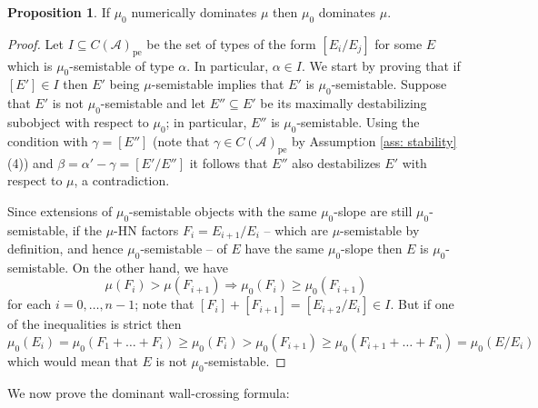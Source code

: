 \documentclass[12pt]{amsart}
\theoremstyle{definition}
\newtheorem{proposition}[definition]{Proposition}
\newcommand{\CA}{{\mathcal A}}
\newcommand{\1}{\mathbf 1}
\newcommand{\pe}{\mathrm{pe}}
\begin{document}
\begin{proposition}
    If $\mu_0$ numerically dominates $\mu$ then $\mu_0$ dominates $\mu$. 
\end{proposition}
\begin{proof}
Let $I\subseteq C(\CA)_\pe$ be the set of types of the form $[E_i/E_j]$ for some $E$ which is $\mu_0$-semistable of type $\alpha$. In particular, $\alpha\in I$. We start by proving that if $[E']\in I$ then $E'$ being $\mu$-semistable implies that $E'$ is $\mu_0$-semistable. Suppose that $E'$ is not $\mu_0$-semistable and let $E''\subseteq E'$ be its maximally destabilizing subobject with respect to $\mu_0$; in particular, $E''$ is $\mu_0$-semistable. Using the condition with $\gamma=[E'']$ (note that $\gamma\in C(\CA)_\pe$ by Assumption \ref{ass: stability}(4)) and $\beta=\alpha'-\gamma=[E'/E'']$ it follows that $E''$ also destabilizes $E'$ with respect to $\mu$, a contradiction.

Since extensions of $\mu_0$-semistable objects with the same $\mu_0$-slope are still $\mu_0$-semistable, if the $\mu$-HN factors $F_i=E_{i+1}/E_i$ -- which are $\mu$-semistable by definition, and hence $\mu_0$-semistable -- of $E$ have the same $\mu_0$-slope then $E$ is $\mu_0$-semistable. On the other hand, we have
\[\mu(F_i)>\mu(F_{i+1})\Rightarrow \mu_0(F_i)\geq \mu_0(F_{i+1})\]
for each $i=0, \ldots, n-1$; note that $[F_i]+[F_{i+1}]=[E_{i+2}/E_i]\in I$. But if one of the inequalities is strict then 
\[\mu_0(E_i)=\mu_0(F_1+\ldots+F_i)\geq \mu_0(F_i)>\mu_0(F_{i+1})\geq \mu_0(F_{i+1}+\ldots+F_n)=\mu_0(E/E_i)\]
which would mean that $E$ is not $\mu_0$-semistable.\qedhere
\end{proof}

We now prove the dominant wall-crossing formula:
\end{document}

